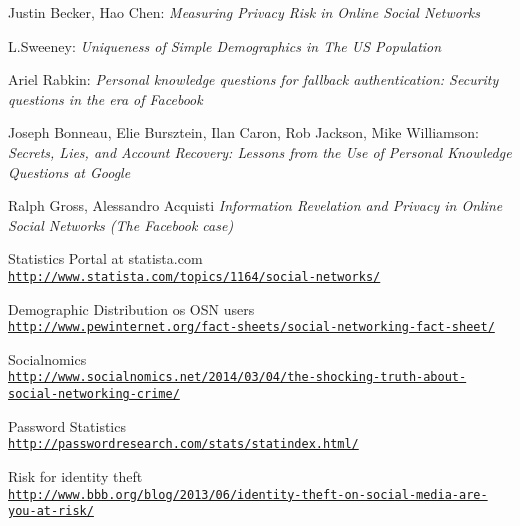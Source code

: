 \documentclass[10pt,conference]{IEEEtran}
\begin{document}
\begin{thebibliography}{1}
Justin Becker, Hao Chen: 
\textit{Measuring Privacy Risk in Online Social Networks}

L.Sweeney: 
\textit{Uniqueness of Simple Demographics in The US Population}

Ariel Rabkin: 
\textit{Personal knowledge questions for fallback authentication: Security questions in the era of Facebook}

Joseph Bonneau, Elie Bursztein, Ilan Caron, Rob Jackson, Mike Williamson:
\textit{Secrets, Lies, and Account Recovery: Lessons from the Use of Personal Knowledge Questions at Google}

Ralph Gross, Alessandro Acquisti
\textit{Information Revelation and Privacy in Online Social Networks (The Facebook case)}

Statistics Portal at statista.com
\\\texttt{\url{http://www.statista.com/topics/1164/social-networks/}}

Demographic Distribution os OSN users
\\\texttt{\url{http://www.pewinternet.org/fact-sheets/social-networking-fact-sheet/}}

Socialnomics
\\\texttt{\url{http://www.socialnomics.net/2014/03/04/the-shocking-truth-about-social-networking-crime/}}

Password Statistics
\\\texttt{\url{http://passwordresearch.com/stats/statindex.html/}}

Risk for identity theft
\\\texttt{\url{http://www.bbb.org/blog/2013/06/identity-theft-on-social-media-are-you-at-risk/}}

\end{thebibliography}
\end{document}
